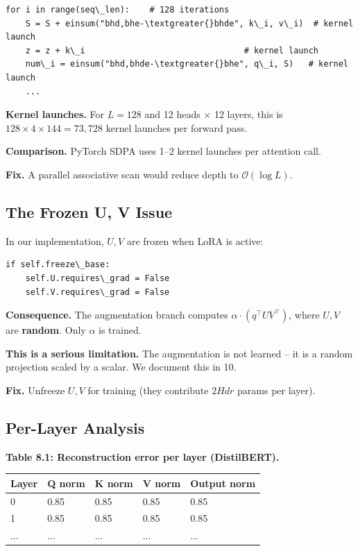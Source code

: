 \begin{lstlisting}
for i in range(seq\_len):    # 128 iterations
    S = S + einsum("bhd,bhe-\textgreater{}bhde", k\_i, v\_i)  # kernel launch
    z = z + k\_i                                # kernel launch
    num\_i = einsum("bhd,bhde-\textgreater{}bhe", q\_i, S)   # kernel launch
    ...
\end{lstlisting}

\textbf{Kernel launches.} For $L = 128$ and 12 heads $\times$ 12 layers, this is 
$128 \times 4 \times 144 = 73{,}728$ kernel launches per forward pass.

\textbf{Comparison.} PyTorch SDPA uses 1--2 kernel launches per attention call.

\textbf{Fix.} A parallel associative scan would reduce depth to $\mathcal{O}(\log L)$.

\subsection{The Frozen U, V Issue}

In our implementation, $U, V$ are frozen when LoRA is active:

\begin{lstlisting}
if self.freeze\_base:
    self.U.requires\_grad = False
    self.V.requires\_grad = False
\end{lstlisting}

\textbf{Consequence.} The augmentation branch computes 
$\alpha \cdot (q^\top U V^\top)$, where $U, V$ are \textbf{random}. Only 
$\alpha$ is trained.

\textbf{This is a serious limitation.} The augmentation is not learned -- it is 
a random projection scaled by a scalar. We document this in  10.

\textbf{Fix.} Unfreeze $U, V$ for training (they contribute $2 H d r$ params 
per layer).

\subsection{Per-Layer Analysis}

\textbf{Table 8.1: Reconstruction error per layer (DistilBERT).}

\begin{table}[H]
\centering
\small
\begin{tabular}{lllll}
\toprule
\textbf{Layer} & \textbf{Q norm} & \textbf{K norm} & \textbf{V norm} & \textbf{Output norm} \\
\midrule
0 & 0.85 & 0.85 & 0.85 & 0.85 \\
1 & 0.85 & 0.85 & 0.85 & 0.85 \\
... & ... & ... & ... & ... \\
\bottomrule
\end{tabular}
\end{table}

